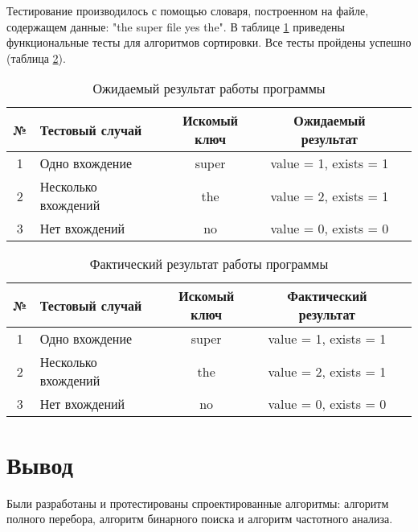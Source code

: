 Тестирование производилось с помощью словаря, построенном на файле, содержащем данные: "the super file yes the". В таблице \ref{tabular:func_test} приведены функциональные тесты для алгоритмов сортировки.  Все тесты пройдены успешно (таблица \ref{tabular:func_test_res}).


\begin{table}[h]
	\begin{center}
		\caption{\label{tabular:func_test} Ожидаемый результат работы программы}
		\begin{tabular}{|c|p{50mm}|c|c|c|}
			\hline
			№ & Тестовый случай & Искомый ключ & Ожидаемый результат \\ \hline
			1 & Одно вхождение &
			super &
			value = 1, exists = 1 \\ \hline
			2 & Несколько вхождений &
			the &
			value = 2, exists = 1\\ \hline
			3 & Нет вхождений &			
			no &
			value = 0, exists = 0\\ \hline
		\end{tabular}
	\end{center}
\end{table}

\begin{table}[h]
	\begin{center}
		\caption{\label{tabular:func_test_res} Фактический результат работы программы}
		\begin{tabular}{|c|p{50mm}|c|c|c|}
			\hline
			№ & Тестовый случай & Искомый ключ & Фактический результат \\ \hline
			1 & Одно вхождение &
			super &
			value = 1, exists = 1 \\ \hline
			2 & Несколько вхождений &
			the &
			value = 2, exists = 1\\ \hline
			3 & Нет вхождений &			
			no &
			value = 0, exists = 0\\ \hline
		\end{tabular}
	\end{center}
\end{table}



\captionsetup{singlelinecheck = false, justification=centering}

\section{Вывод}

Были разработаны и протестированы спроектированные алгоритмы: алгоритм полного перебора, алгоритм бинарного поиска и алгоритм частотного анализа.
